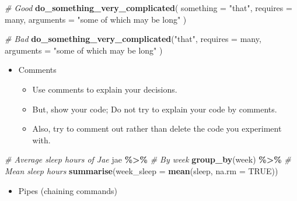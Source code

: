 \documentclass[
]{book}
\newenvironment{Shaded}{\begin{snugshade}}{\end{snugshade}}
\newcommand{\CommentTok}[1]{\textcolor[rgb]{0.56,0.35,0.01}{\textit{#1}}}
\newcommand{\DataTypeTok}[1]{\textcolor[rgb]{0.13,0.29,0.53}{#1}}
\newcommand{\KeywordTok}[1]{\textcolor[rgb]{0.13,0.29,0.53}{\textbf{#1}}}
\newcommand{\NormalTok}[1]{#1}
\newcommand{\OperatorTok}[1]{\textcolor[rgb]{0.81,0.36,0.00}{\textbf{#1}}}
\newcommand{\OtherTok}[1]{\textcolor[rgb]{0.56,0.35,0.01}{#1}}
\newcommand{\StringTok}[1]{\textcolor[rgb]{0.31,0.60,0.02}{#1}}
\providecommand{\tightlist}{%
  \setlength{\itemsep}{0pt}\setlength{\parskip}{0pt}}
\begin{document}
\begin{Shaded}
\begin{Highlighting}[]
\CommentTok{\# Good}
\KeywordTok{do\_something\_very\_complicated}\NormalTok{(}
  \DataTypeTok{something =} \StringTok{"that"}\NormalTok{,}
  \DataTypeTok{requires =}\NormalTok{ many,}
  \DataTypeTok{arguments =} \StringTok{"some of which may be long"}
\NormalTok{)}

\CommentTok{\# Bad}
\KeywordTok{do\_something\_very\_complicated}\NormalTok{(}\StringTok{"that"}\NormalTok{, }\DataTypeTok{requires =}\NormalTok{ many, }\DataTypeTok{arguments =}
                              \StringTok{"some of which may be long"}
\NormalTok{                              )}
\end{Highlighting}
\end{Shaded}

\begin{itemize}
\tightlist
\item
  Comments

  \begin{itemize}
  \tightlist
  \item
    Use comments to explain your decisions.
  \item
    But, show your code; Do not try to explain your code by comments.
  \item
    Also, try to comment out rather than delete the code you experiment with.
  \end{itemize}
\end{itemize}

\begin{Shaded}
\begin{Highlighting}[]
\CommentTok{\# Average sleep hours of Jae}
\NormalTok{jae }\OperatorTok{\%\textgreater{}\%}
\StringTok{  }\CommentTok{\# By week}
\StringTok{  }\KeywordTok{group\_by}\NormalTok{(week) }\OperatorTok{\%\textgreater{}\%}
\StringTok{  }\CommentTok{\# Mean sleep hours }
\StringTok{  }\KeywordTok{summarise}\NormalTok{(}\DataTypeTok{week\_sleep =} \KeywordTok{mean}\NormalTok{(sleep, }\DataTypeTok{na.rm =} \OtherTok{TRUE}\NormalTok{))}
\end{Highlighting}
\end{Shaded}

\begin{itemize}
\tightlist
\item
  Pipes (chaining commands)
\end{itemize}
\end{document}
